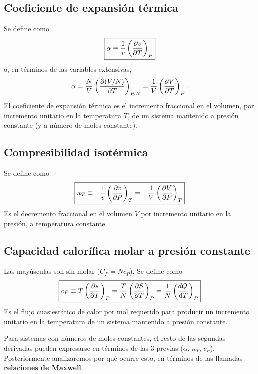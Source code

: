 \subsection*{Coeficiente de expansión térmica}

Se define como
\begin{equation*}
  \boxed{\alpha\equiv\frac{1}{v}\left(\frac{\partial v}{\partial T}\right)_{P}}
\end{equation*}
o, en términos de las variables extensivas,
\begin{equation*}
  \alpha=\frac{N}{V}\left(\frac{\partial (V/N)}{\partial T}\right)_{P,N}=\frac{1}{V}\left(\frac{\partial V}{\partial T}\right)_{P}.
\end{equation*}
El coeficiente de expansión térmica es el incremento fraccional en el volumen, por incremento
unitario en la temperatura $T$, de un sistema mantenido a presión constante (y a número de moles
constante).

\subsection*{Compresibilidad isotérmica}

Se define como
\begin{equation*}
  \boxed{\kappa_T\equiv-\frac{1}{v}\left(\frac{\partial v}{\partial P}\right)_{T}=-\frac{1}{V}\left(\frac{\partial V}{\partial P}\right)_{T}}
\end{equation*}
Es el decremento fraccional en el volumen $V$ por incremento unitario en la presión, a temperatura
constante.

\subsection*{Capacidad calorífica molar a presión constante}

Las mayúsculas son sin molar ($C_P=Nc_P$). Se define como
\begin{equation*}
  \boxed{c_P\equiv T\pdvc{s}{T}{P}=\frac{T}{N}\pdvc{S}{T}{P}=\frac{1}{N}\left(\frac{\dbar Q}{\dd T}\right)_{P}}
\end{equation*}
Es el flujo cuasiestático de calor por mol requerido para producir un incremento unitario en la
temperatura de un sistema mantenido a presión constante.

Para sistemas con números de moles constantes, el resto de las segundas derivadas pueden expresarse
en términos de las $3$ previas ($\alpha$, $\kappa_T$, $c_P$). Posteriormente analizaremos por qué
ocurre esto, en términos de las llamadas \textbf{relaciones de Maxwell}.


